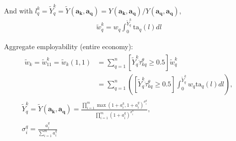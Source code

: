 \documentclass[hidelinks, nonatbib]{elsarticle}
\begin{document}
And with $
l_{q}^{k}
= \tilde{Y}_{q}^{k}
= \tilde{Y}(\boldsymbol{a_k}, \boldsymbol{a_q})
= Y(\boldsymbol{a_k}, \boldsymbol{a_q}) / Y(\boldsymbol{a_q}, \boldsymbol{a_q})$,
\begin{gather}
    \tilde{w}_{q}^{k} =
    w_q
    \int_{0}^{\tilde{Y}_{q}^{k}}
    \text{ta}_q(l)
    dl
\end{gather}

Aggregate employability (entire economy):
\begin{gather}
    \begin{align}
        \tilde{w}_{k} =
        \tilde{w}_{11}^{k} =
        \tilde{w}_{k}(1, 1)
        &=
        \sum_{q=1}^{n}{
            [
                \tilde{Y}_{q}^{k}
                \ddot{\tau}_{kq}^{\theta}
                \geq 0.5
            ]
            \tilde{w}_{q}^{k}
        }
        \\
        &=
        \sum_{q=1}^{n}{
            \left(
                [
                \tilde{Y}_{q}^{k}
                \ddot{\tau}_{kq}^{\theta}
                \geq 0.5
                ]
                \int_{0}^{\tilde{Y}_{q}^{k}}{
                    w_q
                    \text{ta}_q(l)
                    dl
                }
            \right)
        }
        ,
    \end{align}
    \\
    \tilde{Y}_{q}^{k} = 
    \tilde{Y}(
        \boldsymbol{a_k},
        \boldsymbol{a_q}
        ) =
        \frac{
            \prod_{i=1}^{m}{
                {
                    \max(
                        1 + a_{i}^{k},
                        1 + a_{i}^{q}
                    )
                } ^ {
                    \sigma_{i}^{q}
                }
            }
        }{
            \prod_{i=1}^{m}{
                {
                    (
                        1 + a_{i}^{q}
                    )
                } ^ {
                    \sigma_{i}^{q}
                }
            }
        }
        ,\\
        \sigma_{i}^{q} = 
        \frac{
            a_{i}^{q}
        }{
            \sum_{i=1}^{m}{
                a_{i}^{q}
            }
        }
\end{gather}
\end{document}
